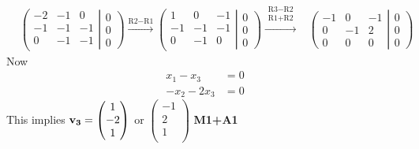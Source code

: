 \documentclass[12pt]{exam}
\begin{document}
\begin{questions}
\begin{solution}
\begin{enumerate}
	\begin{align*}
	& \left(
	\begin{matrix}
	-2 & -1 & 0 \\
	-1 & -1 & -1 \\
	0 & -1  & -1 \\
	\end{matrix}
	\right.\left|\left.
	\begin{matrix}
	0\\ 0 \\ 0
	\end{matrix}
	\right)\right. 
	\xrightarrow{ \text{R2}-\text{R1}} 
	\left(
	\begin{matrix}
	1 & 0 & -1 \\
	-1 & -1 & -1 \\
	0 & -1  & 0 \\
	\end{matrix}
	\right.\left|\left.
	\begin{matrix}
	0\\ 0 \\ 0
	\end{matrix}
	\right)\right.
	\xrightarrow{\substack{\text{R3}-\text{R2} \\
			\text{R1}+\text{R2}}} 
	& \left(
	\begin{matrix}
	-1 & 0 & -1  \\
	0 & -1 & 2\\
	0 & 0 &  0 
	\end{matrix}
	\right.\left|\left.
	\begin{matrix}
	0\\ 0 \\ 0
	\end{matrix}
	\right)\right.
	\end{align*}
	Now \begin{align*}
	x_1-x_3 &= 0\\
	-x_2-2x_3 &= 0
	\end{align*}
	This implies $ \bf{v_3} = \begin{pmatrix}
	1 \\
	-2 \\
	1\\
	\end{pmatrix}$ or  $\begin{pmatrix}
	-1 \\
	2\\
	1\\
	\end{pmatrix}$ \hfill \textbf{M1+A1}
	

\end{enumerate}
\end{solution}
\end{questions}
\end{document}
